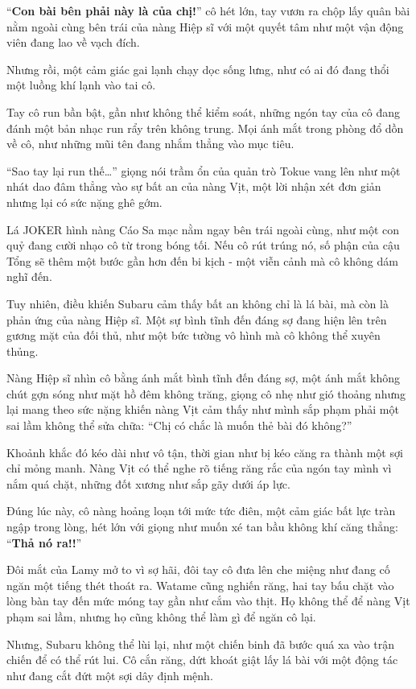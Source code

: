 \documentclass[../main.tex]{subfiles}
\begin{document}
``\textbf{Con bài bên phải này là của chị!}'' cô hét lớn, tay vươn ra chộp lấy quân bài nằm ngoài cùng bên trái của nàng Hiệp sĩ với một quyết tâm như một vận động viên đang lao về vạch đích.

Nhưng rồi, một cảm giác gai lạnh chạy dọc sống lưng, như có ai đó đang thổi một luồng khí lạnh vào tai cô.

Tay cô run bần bật, gần như không thể kiểm soát, những ngón tay của cô đang đánh một bản nhạc run rẩy trên không trung. Mọi ánh mắt trong phòng đổ dồn về cô, như những mũi tên đang nhắm thẳng vào mục tiêu.


``Sao tay lại run thế\dots'' giọng nói trầm ổn của quản trò Tokue vang lên như một nhát dao đâm thẳng vào sự bất an của nàng Vịt, một lời nhận xét đơn giản nhưng lại có sức nặng ghê gớm.

Lá JOKER hình nàng Cáo Sa mạc nằm ngay bên trái ngoài cùng, như một con quỷ đang cười nhạo cô từ trong bóng tối. Nếu cô rút trúng nó, số phận của cậu Tổng sẽ thêm một bước gần hơn đến bi kịch - một viễn cảnh mà cô không dám nghĩ đến.

Tuy nhiên, điều khiến Subaru cảm thấy bất an không chỉ là lá bài, mà còn là phản ứng của nàng Hiệp sĩ. Một sự bình tĩnh đến đáng sợ đang hiện lên trên gương mặt của đối thủ, như một bức tường vô hình mà cô không thể xuyên thủng.

Nàng Hiệp sĩ nhìn cô bằng ánh mắt bình tĩnh đến đáng sợ, một ánh mắt không chút gợn sóng như mặt hồ đêm không trăng, giọng cô nhẹ như gió thoảng nhưng lại mang theo sức nặng khiến nàng Vịt cảm thấy như mình sắp phạm phải một sai lầm không thể sửa chữa: ``Chị có chắc là muốn thẻ bài đó không?''

Khoảnh khắc đó kéo dài như vô tận, thời gian như bị kéo căng ra thành một sợi chỉ mỏng manh. Nàng Vịt có thể nghe rõ tiếng răng rắc của ngón tay mình vì nắm quá chặt, những đốt xương như sắp gãy dưới áp lực.

Đúng lúc này, cô nàng hoảng loạn tới mức tức điên, một cảm giác bất lực tràn ngập trong lòng, hét lớn với giọng như muốn xé tan bầu không khí căng thẳng: ``\textbf{Thả nó ra!!}''

Đôi mắt của Lamy mở to vì sợ hãi, đôi tay cô đưa lên che miệng như đang cố ngăn một tiếng thét thoát ra. Watame cũng nghiến răng, hai tay bấu chặt vào lòng bàn tay đến mức móng tay gần như cắm vào thịt. Họ không thể để nàng Vịt phạm sai lầm, nhưng họ cũng không thể làm gì để ngăn cô lại.

Nhưng, Subaru không thể lùi lại, như một chiến binh đã bước quá xa vào trận chiến để có thể rút lui. Cô cắn răng, dứt khoát giật lấy lá bài với một động tác như đang cắt đứt một sợi dây định mệnh.
\end{document}
